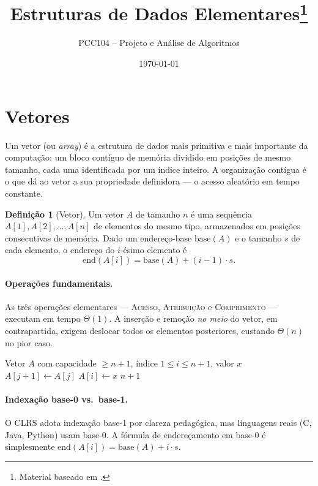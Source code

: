 \documentclass[9pt,a4paper]{extarticle}
\title{Estruturas de Dados Elementares\footnote{Material baseado em \citep{cormen2009}.}}
\author{PCC104 -- Projeto e Análise de Algoritmos}
\date{\today}
\newcommand{\impt}[1]{\textcolor{important}{#1}}
\newcommand{\ntc}[1]{\textcolor{notice}{#1}}
\theoremstyle{definition}
\newtheorem{definition}{Definição}[section]
\begin{document}
\maketitle
\tableofcontents

\section{Vetores}

Um \impt{vetor} (ou \emph{array}) é a estrutura de dados mais primitiva e mais importante da computação: um bloco contíguo de memória dividido em posições de mesmo tamanho, cada uma identificada por um índice inteiro. A organização contígua é o que dá ao vetor a sua propriedade definidora — o \ntc{acesso aleatório em tempo constante}.

\begin{definition}[Vetor]
Um vetor $A$ de tamanho $n$ é uma sequência $A[1], A[2], \ldots, A[n]$ de elementos do mesmo tipo, armazenados em posições consecutivas de memória. Dado um endereço-base $\mathrm{base}(A)$ e o tamanho $s$ de cada elemento, o endereço do $i$-ésimo elemento é
\[
\mathrm{end}(A[i]) = \mathrm{base}(A) + (i - 1) \cdot s.
\]
\end{definition}

\paragraph{Operações fundamentais.} As três operações elementares — \textsc{Acesso}, \textsc{Atribuição} e \textsc{Comprimento} — executam em tempo $\Theta(1)$. A inserção e remoção \emph{no meio} do vetor, em contrapartida, exigem deslocar todos os elementos posteriores, custando $\Theta(n)$ no pior caso.

\begin{algorithm}[H]
\caption{\textsc{Inserir}($A, n, i, x$) -- insere $x$ na posição $i$ de um vetor de tamanho $n$}
\begin{algorithmic}[1]
\Require Vetor $A$ com capacidade $\geq n+1$, índice $1 \leq i \leq n+1$, valor $x$
    \State $A[j+1] \gets A[j]$
\EndFor
\State $A[i] \gets x$
\State \Return $n + 1$
\end{algorithmic}
\end{algorithm}

\paragraph{Indexação base-0 vs.\ base-1.} O CLRS adota indexação base-1 por clareza pedagógica, mas \impt{linguagens reais (C, Java, Python) usam base-0}. A fórmula de endereçamento em base-0 é simplesmente $\mathrm{end}(A[i]) = \mathrm{base}(A) + i \cdot s$.
\end{document}
